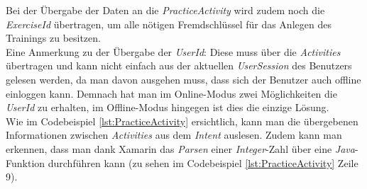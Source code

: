 
Bei der Übergabe der Daten an die \textit{PracticeActivity} wird zudem noch die \textit{ExerciseId} übertragen, um alle nötigen Fremdschlüssel für das Anlegen des Trainings zu besitzen.\\
Eine Anmerkung zu der Übergabe der \textit{UserId}: Diese muss über die \textit{Activities} übertragen und kann nicht einfach aus der aktuellen \textit{UserSession} des Benutzers gelesen werden, da man davon ausgehen muss, dass sich der Benutzer auch offline einloggen kann. Demnach hat man im Online-Modus zwei Möglichkeiten die \textit{UserId} zu erhalten, im Offline-Modus hingegen ist dies die einzige Lösung.\\

Wie im Codebeispiel \ref{lst:PracticeActivity} ersichtlich, kann man die übergebenen Informationen zwischen \textit{Activities} aus dem \textit{Intent} auslesen. Zudem kann man erkennen, dass man dank Xamarin das \textit{Parsen} einer \textit{Integer}-Zahl über eine \textit{Java}-Funktion durchführen kann (zu sehen im Codebeispiel \ref{lst:PracticeActivity} Zeile 9).\\
